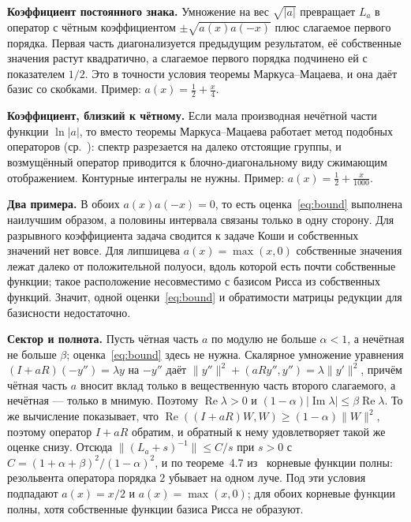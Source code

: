 \documentclass[12pt,a4paper]{article}
\begin{document}
\textbf{Коэффициент постоянного знака.} Умножение на вес $\sqrt{|a|}$ превращает $L_a$ в
оператор с чётным коэффициентом $\pm\sqrt{a(x)a(-x)}$ плюс слагаемое первого порядка.
Первая часть диагонализуется предыдущим результатом, её собственные значения растут
квадратично, а слагаемое первого порядка подчинено ей с показателем $1/2$. Это в точности
условия теоремы Маркуса--Мацаева, и она даёт базис со скобками. Пример:
$a(x)=\tfrac12+\tfrac x4$.

\textbf{Коэффициент, близкий к чётному.} Если мала производная нечётной части функции
$\ln|a|$, то вместо теоремы Маркуса--Мацаева работает метод подобных операторов
(ср.~\cite{S5}): спектр разрезается на далеко отстоящие группы, и возмущённый оператор
приводится к блочно-диагональному виду сжимающим отображением. Контурные интегралы не
нужны. Пример: $a(x)=\tfrac12+\tfrac x{1000}$.

\textbf{Два примера.} В обоих $a(x)a(-x)=0$, то есть оценка~\eqref{eq:bound} выполнена
наилучшим образом, а половины интервала связаны только в одну сторону. Для разрывного
коэффициента задача сводится к задаче Коши и собственных значений нет вовсе. Для
липшицева $a(x)=\max(x,0)$ собственные значения лежат далеко от положительной полуоси,
вдоль которой есть почти собственные функции; такое расположение несовместимо с базисом
Рисса из собственных функций. Значит, одной оценки~\eqref{eq:bound} и обратимости
матрицы редукции для базисности недостаточно.

\textbf{Сектор и полнота.} Пусть чётная часть $a$ по модулю не больше $\alpha<1$, а
нечётная не больше $\beta$; оценка~\eqref{eq:bound} здесь не нужна. Скалярное умножение
уравнения $(I+aR)(-y'')=\lambda y$ на $-y''$ даёт
$\|y''\|^2+(aRy'',y'')=\lambda\|y'\|^2$, причём чётная часть $a$ вносит вклад только в
вещественную часть второго слагаемого, а нечётная --- только в мнимую. Поэтому
$\operatorname{Re}\lambda>0$ и $(1-\alpha)|\operatorname{Im}\lambda|\le\beta\operatorname{Re}\lambda$.
То же вычисление показывает, что $\operatorname{Re}((I+aR)W,W)\ge(1-\alpha)\|W\|^2$,
поэтому оператор $I+aR$ обратим, и обратный к нему удовлетворяет такой же оценке снизу.
Отсюда $\|(L_a+s)^{-1}\|\le C/s$ при $s>0$ с $C=(1+\alpha+\beta)^2/(1-\alpha)^2$, и по
теореме~4.7 из~\cite{S3} корневые функции полны: резольвента оператора порядка $2$
убывает на одном луче. Под эти условия подпадают $a(x)=x/2$ и $a(x)=\max(x,0)$; для
обоих корневые функции полны, хотя собственные функции базиса Рисса не образуют.
\end{document}
